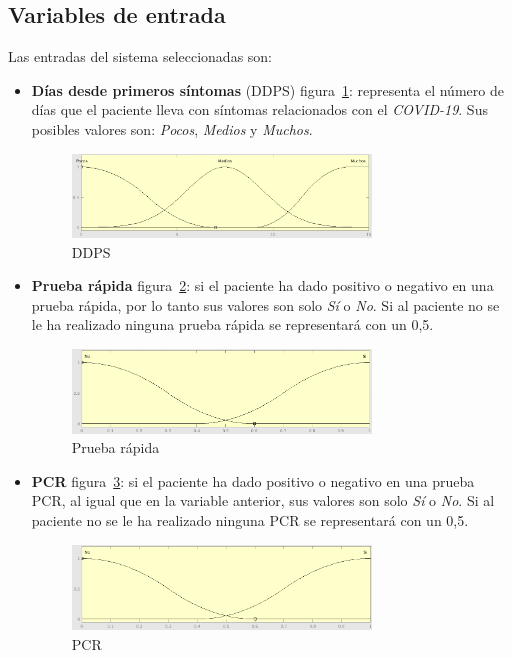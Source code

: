 \documentclass[12pt,a4paper, xcolor=table]{article}
\begin{document}
\subsection{Variables de entrada}

Las entradas del sistema seleccionadas son:

\begin{itemize}
  \item \textbf{Días desde primeros síntomas} (DDPS) figura~\ref{DDPS}: representa el número de días que el paciente lleva con síntomas relacionados con el \textit{COVID-19}. Sus posibles valores son: \textit{Pocos}, \textit{Medios} y \textit{Muchos}.

  \begin{figure}[!h]
      \centering
      \includegraphics[width=300px]{img/dias_primeros_sintomas.png}
      \caption{DDPS}
      \label{DDPS}
  \end{figure}

  \item \textbf{Prueba rápida} figura~\ref{PR}: si el paciente ha dado positivo o negativo en una prueba rápida, por lo tanto sus valores son solo \textit{Sí} o \textit{No}. Si al paciente no se le ha realizado ninguna prueba rápida se representará con un 0,5.

  \begin{figure}[!h]
      \centering
      \includegraphics[width=300px]{img/prueba_rapida.png}
      \caption{Prueba rápida}
      \label{PR}
  \end{figure}

  \item \textbf{PCR} figura~\ref{PCR}: si el paciente ha dado positivo o negativo en una prueba PCR, al igual que en la variable anterior, sus valores son solo \textit{Sí} o \textit{No}. Si al paciente no se le ha realizado ninguna PCR se representará con un 0,5.

  \begin{figure}[!h]
      \centering
      \includegraphics[width=300px]{img/PCR.png}
      \caption{PCR}
      \label{PCR}
  \end{figure}


\end{itemize}
\end{document}
